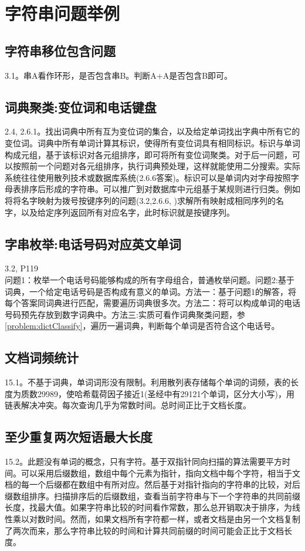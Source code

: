 \section{字符串问题举例}

\subsection{字符串移位包含问题}
\cite{bop}3.1。串A看作环形，是否包含串B。判断A+A是否包含B即可。


\subsection{词典聚类:变位词和电话键盘}
\cite{pp}2.4, 2.6.1。找出词典中所有互为变位词的集合，以及给定单词找出字典中所有它的变位词。词典中所有单词计算其标识，使得所有变位词具有相同标识。标识与单词构成元组，基于该标识对各元组排序，即可将所有变位词聚类。对于后一问题，可以按照前一个问题对各元组排序，执行词典预处理，这样就能使用二分搜索。实际系统往往使用散列技术或数据库系统(\cite{pp}2.6.6答案)。标识可以是单词内对字母按照字母表排序后形成的字符串。可以推广到对数据库中元组基于某规则进行归类。例如将将名字映射为拨号按键序列的问题(\cite{bop}3.2,\cite{pp}2.6.6, \cite{pie})求解所有映射成相同序列的名字，以及给定序列返回所有对应名字，此时标识就是按键序列。
\label{problem:dictClassify}

\subsection{字串枚举:电话号码对应英文单词}
\cite{bop}3.2, \cite{pie}P119\\
问题1：枚举一个电话号码能够构成的所有字母组合，普通枚举问题。问题2:基于词典，一个给定电话号码是否构成有意义的单词。方法一：基于问题1的解答，将每个答案同词典进行匹配，需要遍历词典很多次。方法二：将可以构成单词的电话号码预先存放到数字词典中。方法三:实质可看作词典聚类问题，参\ref{problem:dictClassify}，遍历一遍词典，判断每个单词是否符合这个电话号。
\label{question:phonekeyboard}

\subsection{文档词频统计}
\cite{pp}15.1。不基于词典，单词词形没有限制。利用散列表存储每个单词的词频，表的长度为质数29989，使哈希载荷因子接近1(圣经中有29121个单词，区分大小写)，用链表解决冲突。每次查询几乎为常数时间。总时间正比于文档长度。

\subsection{至少重复两次短语最大长度}
\cite{pp}15.2。此题没有单词的概念，只有字符。基于双指针同向扫描的算法需要平方时间。可以采用后缀数组，数组中每个元素为指针，指向文档中每个字符，相当于文档的每一个后缀都在数组中有所对应。然后基于对指针指向的字符串的比较，对后缀数组排序。扫描排序后的后缀数组，查看当前字符串与下一个字符串的共同前缀长度，找最大值。如果字符串比较的时间看作常数，那么总开销取决于排序，为线性乘以对数时间。然而，如果文档所有字符都一样，或者文档是由另一个文档复制了两次而来，那么字符串比较的时间和计算共同前缀的时间可能会正比于文档长度。

